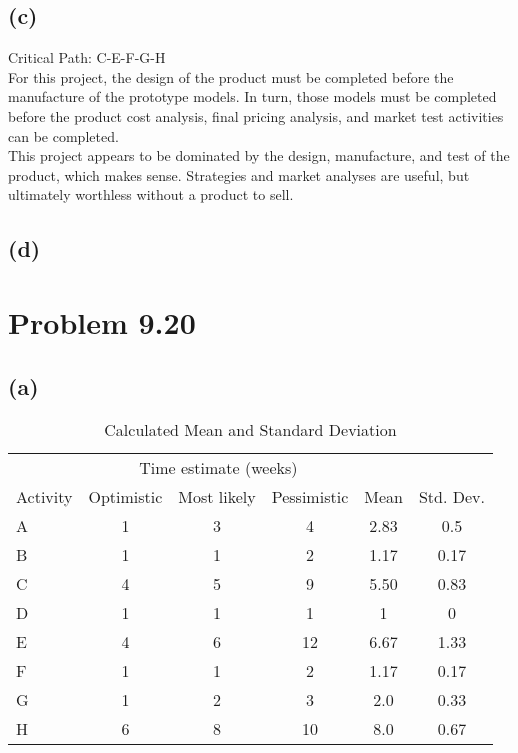 \documentclass{article}
\begin{document}
	\subsection*{(c)}
	Critical Path: C-E-F-G-H\\
	For this project, the design of the product must be completed before the manufacture of the prototype models. In turn, those models must be completed before the product cost analysis, final pricing analysis, and market test activities can be completed.\\
	This project appears to be dominated by the design, manufacture, and test of the product, which makes sense. Strategies and market analyses are useful, but ultimately worthless without a product to sell.
	\subsection*{(d)}
	\begin{center}
	\makebox[\textwidth]{
		}
	\end{center}
	
	\section*{Problem 9.20}
	\subsection*{(a)}
	
	{\renewcommand{\arraystretch}{1.2} 
	\begin{table}[h!tbp]
  		\begin{center}
    		\caption{Calculated Mean and Standard Deviation}
    		\label{tab:table3}
			
    		\begin{tabular}{lccccc}
				\hline
				&\multicolumn{3}{c}{Time estimate (weeks)} &&\\\cline{2-4}
				Activity & Optimistic & Most likely & Pessimistic & Mean & Std. Dev.\\
				\hline
				A & 1 & 3 & 4  & 2.83 & 0.5\\
				B & 1 & 1 & 2  & 1.17 & 0.17\\
				C & 4 & 5 & 9  & 5.50 & 0.83\\
				D & 1 & 1 & 1  & 1    & 0\\
				E & 4 & 6 & 12 & 6.67 & 1.33\\
				F & 1 & 1 & 2  & 1.17 & 0.17\\
				G & 1 & 2 & 3  & 2.0  & 0.33\\
				H & 6 & 8 & 10 & 8.0  & 0.67\\
				\hline
    		\end{tabular}
  		\end{center}
	\end{table}
	}
	
\end{document}
